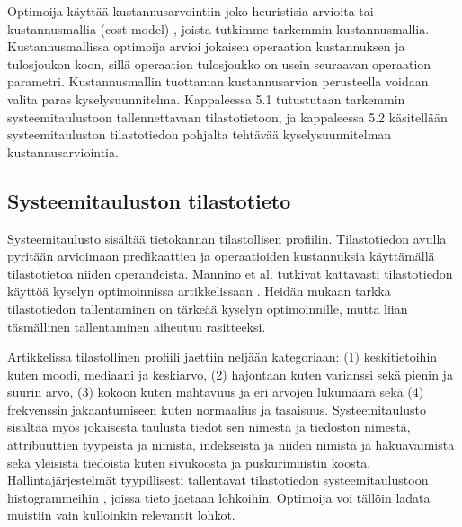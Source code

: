 \documentclass[finnish]{tktltiki2}
\theoremstyle{definition}
\theoremstyle{remark}
\begin{document}
Optimoija käyttää kustannusarvointiin joko heuristisia arvioita tai kustannusmallia (cost model) \cite{jarke1984}, joista tutkimme tarkemmin kustannusmallia. Kustannusmallissa optimoija arvioi jokaisen operaation kustannuksen ja tulosjoukon koon, sillä operaation tulosjoukko on usein seuraavan operaation parametri. Kustannusmallin tuottaman kustannusarvion perusteella voidaan valita paras kyselysuunnitelma. Kappaleessa 5.1 tutustutaan tarkemmin systeemitaulustoon tallennettavaan tilastotietoon, ja kappaleessa 5.2 käsitellään systeemitauluston tilastotiedon pohjalta tehtävää kyselysuunnitelman kustannusarviointia.


\subsection{Systeemitauluston tilastotieto}
Systeemitaulusto sisältää tietokannan tilastollisen profiilin. Tilastotiedon avulla pyritään arvioimaan predikaattien ja operaatioiden kustannuksia käyttämällä tilastotietoa niiden operandeista. Mannino et al. tutkivat kattavasti tilastotiedon käyttöä kyselyn optimoinnissa artikkelissaan \cite{mannino1988statistical}. Heidän mukaan tarkka tilastotiedon tallentaminen on tärkeää kyselyn optimoinnille, mutta liian täsmällinen tallentaminen aiheutuu rasitteeksi.

Artikkelissa tilastollinen profiili jaettiin neljään kategoriaan: (1) keskitietoihin kuten moodi, mediaani ja keskiarvo,  (2) hajontaan kuten varianssi sekä pienin ja suurin arvo, (3) kokoon kuten mahtavuus ja eri arvojen lukumäärä sekä (4) frekvenssin jakaantumiseen kuten normaalius ja tasaisuus. Systeemitaulusto sisältää myös jokaisesta taulusta tiedot sen nimestä ja tiedoston nimestä,  attribuuttien tyypeistä ja nimistä, indekseistä ja niiden nimistä ja hakuavaimista sekä yleisistä tiedoista kuten sivukoosta ja puskurimuistin koosta. Hallintajärjestelmät tyypillisesti tallentavat tilastotiedon systeemitaulustoon histogrammeihin \cite{chaudhuri1988}, joissa tieto jaetaan lohkoihin. Optimoija voi tällöin ladata muistiin vain kulloinkin relevantit lohkot. %
\end{document}

